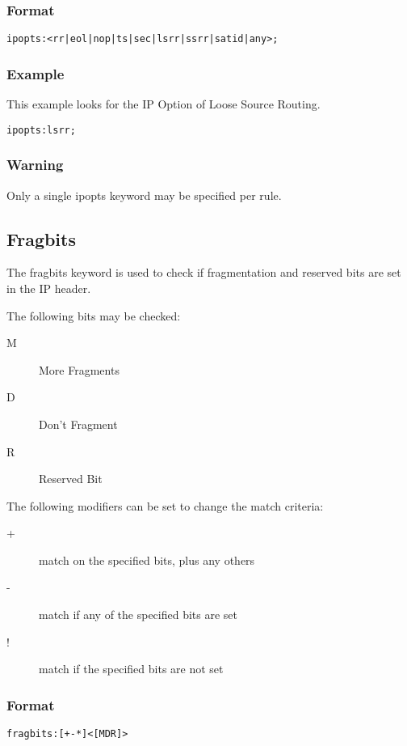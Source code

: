 \documentclass[english]{report}
\begin{document}
\subsubsection{Format}

\begin{verbatim}
ipopts:<rr|eol|nop|ts|sec|lsrr|ssrr|satid|any>;
\end{verbatim}

\subsubsection{Example}
This example looks for the IP Option of Loose Source Routing.
\begin{verbatim}
ipopts:lsrr;
\end{verbatim}

\subsubsection{Warning}
Only a single ipopts keyword may be specified per rule.

\subsection{Fragbits}

The fragbits keyword is used to check if fragmentation and reserved bits are set in the IP header.

The following bits may be checked:
\begin{description}
\item [M] More Fragments
\item [D] Don't Fragment
\item [R] Reserved Bit
\end{description}

The following modifiers can be set to change the match criteria:
\begin{description}
\item [+] match on the specified bits, plus any others
\item [-] match if any of the specified bits are set
\item [!] match if the specified bits are not set
\end{description}

\subsubsection{Format}

\begin{verbatim}
fragbits:[+-*]<[MDR]>
\end{verbatim}
\end{document}
